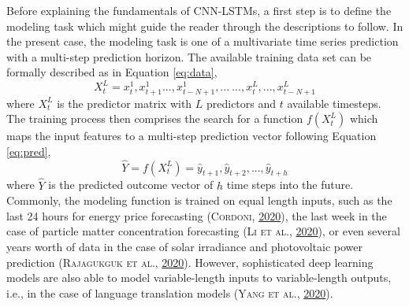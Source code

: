 \documentclass[a4paper,11pt]{article}
\begin{document}
Before explaining the fundamentals of CNN-LSTMs, a first step is to define the
modeling task which might guide the reader through the descriptions to follow.
In the present case, the modeling task is one of a multivariate time series
prediction with a multi-step prediction horizon. The available training data
set can be formally described as in Equation \eqref{eq:data},
\begin{equation}
X_t^L= x_t^1,x_{t+1}^1...,x_{t-N+1}^1,...\ ..., x_t^L,...,x_{t-N+1}^L
\label{eq:data}
\end{equation}
where \(X_t^L\) is the predictor matrix with \(L\) predictors and \(t\) available
timesteps. The training process then comprises the search for a function
\(f(X_t^L)\) which maps the input features to a multi-step prediction vector following
Equation \eqref{eq:pred},
\begin{equation}
\hat{Y} = f(X_t^L) = {\hat{y}_{t+1},\hat{y}_{t+2},...,\hat{y}_{t+h}}
\label{eq:pred}
\end{equation}
where \(\hat{Y}\) is the predicted outcome vector of \(h\) time steps into the future.
Commonly, the modeling function is trained on equal length inputs,
such as the last 24 hours for energy price forecasting \textsc{(\textnormal{\textsc{Cordoni}}, \textnormal{\protect\hyperlink{ref-cordoni2020}{2020}})},
the last week in the case of particle matter concentration forecasting \textsc{(\textnormal{\textsc{Li} \textsc{et al.}}, \textnormal{\protect\hyperlink{ref-li2020}{2020}})},
or even several years worth of data in the case of solar irradiance and photovoltaic
power prediction \textsc{(\textnormal{\textsc{Rajagukguk} \textsc{et al.}}, \textnormal{\protect\hyperlink{ref-rajagukguk2020}{2020}})}. However, sophisticated deep learning models
are also able to model variable-length inputs to variable-length outputs, i.e., in
the case of language translation models \textsc{(\textnormal{\textsc{Yang} \textsc{et al.}}, \textnormal{\protect\hyperlink{ref-yang2020}{2020}})}.
\end{document}
